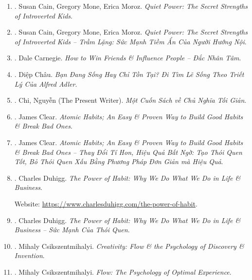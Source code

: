 \documentclass{article}
\begin{document}
\begin{enumerate}
	\item \cite{Cain_Mone_Moroz_quiet_power}. Susan Cain, Gregory Mone, Erica Moroz. {\it Quiet Power: The Secret Strengths of Introverted Kids}.\hfill{\sf[reading]}
	
	\item \cite{Cain_Mone_Moroz_quiet_power_VN}. Susan Cain, Gregory Mone, Erica Moroz. {\it Quiet Power: The Secret Strengths of Introverted Kids -- Trầm Lặng: Sức Mạnh Tiềm Ẩn Của Người Hướng Nội}.\hfill{\sf[done]}
	
	\item \cite{Carnegie2021}. Dale Carnegie. {\it How to Win Friends \& Influence People -- Đắc Nhân Tâm}.\hfill{\sf[done]}
	
	\item \cite{Chau_live_exist}. {\sc Diệp Châu}. {\it Bạn Đang Sống Hay Chỉ Tồn Tại? Đi Tìm Lẽ Sống Theo Triết Lý Của Alfred Adler}.\hfill{\sf[done]}
	
	\item \cite{Chi_minimalism}. Chi, Nguyễn (The Present Writer). {\it Một Cuốn Sách về Chủ Nghĩa Tối Giản}. \hfill{\sf[done]}
	
	\item \cite{Clear_habit}. James Clear. {\it Atomic Habits; An Easy \& Proven Way to Build Good Habits \& Break Bad Ones}.\hfill{\sf[reading]}
	
	\item \cite{Clear_habit_VN}. James Clear. {\it Atomic Habits; An Easy \& Proven Way to Build Good Habits \& Break Bad Ones -- Thay Đổi Tí Hon, Hiệu Quả Bất Ngờ: Tạo Thói Quen Tốt, Bỏ Thói Quen Xấu Bằng Phương Pháp Đơn Giản mà Hiệu Quả}.\hfill{\sf[done]}
	
	\item \cite{Duhigg_habit}. {\sc Charles Duhigg}. {\it The Power of Habit: Why We Do What We Do in Life \& Business}.
	
	Website: \url{https://www.charlesduhigg.com/the-power-of-habit}.
	
	\item \cite{Duhigg_habit_VN}. {\sc Charles Duhigg}. {\it The Power of Habit: Why We Do What We Do in Life \& Business -- Sức Mạnh Của Thói Quen}.\hfill{\sf[done]}
	
	\item \cite{Csikszentmihalyi_creativity}. {\sc Mihaly Csikszentmihalyi}. {\it Creativity: Flow \& the Psychology of Discovery \& Invention}.\hfill{\sf[reading]}
	
	\item \cite{Csikszentmihalyi_flow}. {\sc Mihaly Csikszentmihalyi}. {\it Flow: The Psychology of Optimal Experience}.\hfill{\sf[reading]}
	

\end{enumerate}
\end{document}
